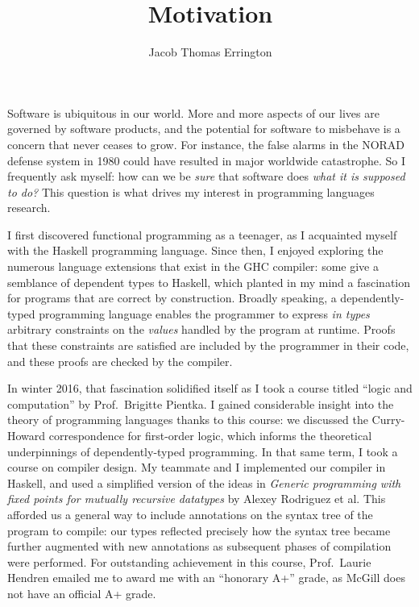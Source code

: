 \documentclass[11pt,letterpaper]{article}
\author{Jacob Thomas Errington}
\title{Motivation}
\date{}
\begin{document}
\maketitle

Software is ubiquitous in our world. More and more aspects of our lives are
governed by software products, and the potential for software to misbehave is a
concern that never ceases to grow.
For instance, the false alarms in the NORAD defense system in 1980 could have
resulted in major worldwide catastrophe.
So I frequently ask myself: how can we be \emph{sure} that software does
\emph{what it is supposed to do?}
This question is what drives my interest in programming languages research.

I first discovered functional programming as a teenager, as I acquainted myself
with the Haskell programming language.
Since then, I enjoyed exploring the numerous language extensions that exist in
the GHC compiler:
some give a semblance of dependent types to Haskell, which planted in
my mind a fascination for programs that are correct by construction.
Broadly speaking, a dependently-typed programming language enables the
programmer to express \emph{in types} arbitrary constraints on the
\emph{values} handled by the program at runtime.
Proofs that these constraints are satisfied are included by the programmer
in their code, and these proofs are checked by the compiler.

In winter 2016, that fascination solidified itself as I took a course titled
``logic and computation'' by Prof.~Brigitte Pientka.
I gained considerable insight into the theory of programming languages thanks
to this course: we discussed the Curry-Howard correspondence for first-order
logic, which informs the theoretical underpinnings of dependently-typed
programming.
%
In that same term, I took a course on compiler design. My teammate and I
implemented our compiler in Haskell, and used a simplified version of the ideas
in \textit{Generic programming with fixed points for mutually recursive
datatypes} by Alexey Rodriguez et al.
This afforded us a general way to include annotations on the syntax tree of the
program to compile: our types reflected precisely how the syntax tree became
further augmented with new annotations as subsequent phases of compilation were
performed.
%
For outstanding achievement in this course, Prof.~Laurie Hendren emailed me to
award me with an ``honorary A+'' grade, as McGill does not have an official A+
grade.
\end{document}
